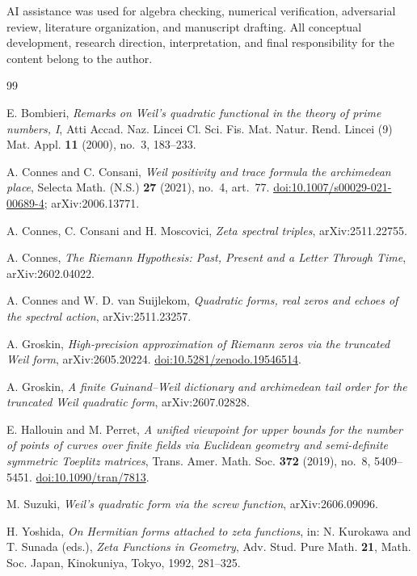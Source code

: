 \documentclass[11pt,a4paper]{article}
\theoremstyle{definition}
\theoremstyle{remark}
\begin{document}
AI assistance was used for algebra checking, numerical verification, adversarial review,
literature organization, and manuscript drafting. All conceptual development, research
direction, interpretation, and final responsibility for the content belong to the author.

\begin{thebibliography}{99}

 E. Bombieri,
\emph{Remarks on Weil's quadratic functional in the theory of prime numbers, I},
Atti Accad. Naz. Lincei Cl. Sci. Fis. Mat. Natur. Rend. Lincei (9) Mat. Appl. \textbf{11}
(2000), no.~3, 183--233.

 A. Connes and C. Consani,
\emph{Weil positivity and trace formula the archimedean place},
Selecta Math. (N.S.) \textbf{27} (2021), no.~4, art.~77.
\href{https://doi.org/10.1007/s00029-021-00689-4}{doi:10.1007/s00029-021-00689-4};
arXiv:2006.13771.

 A. Connes, C. Consani and H. Moscovici,
\emph{Zeta spectral triples}, arXiv:2511.22755.

 A. Connes,
\emph{The Riemann Hypothesis: Past, Present and a Letter Through Time}, arXiv:2602.04022.

 A. Connes and W. D. van Suijlekom,
\emph{Quadratic forms, real zeros and echoes of the spectral action}, arXiv:2511.23257.

 A. Groskin,
\emph{High-precision approximation of Riemann zeros via the truncated Weil form},
arXiv:2605.20224. \href{https://doi.org/10.5281/zenodo.19546514}{doi:10.5281/zenodo.19546514}.

 A. Groskin,
\emph{A finite Guinand--Weil dictionary and archimedean tail order for the truncated Weil
quadratic form}, arXiv:2607.02828.

 E. Hallouin and M. Perret,
\emph{A unified viewpoint for upper bounds for the number of points of curves over finite
fields via Euclidean geometry and semi-definite symmetric Toeplitz matrices},
Trans. Amer. Math. Soc. \textbf{372} (2019), no.~8, 5409--5451.
\href{https://doi.org/10.1090/tran/7813}{doi:10.1090/tran/7813}.

 M. Suzuki,
\emph{Weil's quadratic form via the screw function}, arXiv:2606.09096.

 H. Yoshida,
\emph{On Hermitian forms attached to zeta functions},
in: N. Kurokawa and T. Sunada (eds.), \emph{Zeta Functions in Geometry},
Adv. Stud. Pure Math. \textbf{21}, Math. Soc. Japan, Kinokuniya, Tokyo, 1992, 281--325.


\end{thebibliography}
\end{document}
